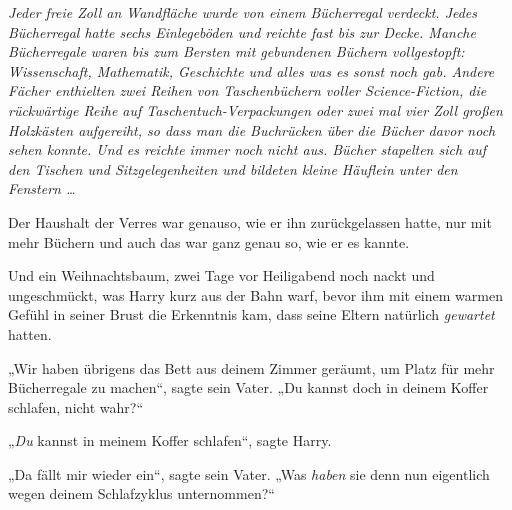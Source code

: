 \emph{Jeder freie Zoll an Wandfläche wurde von einem Bücherregal verdeckt. Jedes Bücherregal hatte sechs Einlegeböden und reichte fast bis zur Decke. Manche Bücherregale waren bis zum Bersten mit gebundenen Büchern vollgestopft: Wissenschaft, Mathematik, Geschichte und alles was es sonst noch gab. Andere Fächer enthielten zwei Reihen von Taschenbüchern voller Science-Fiction, die rückwärtige Reihe auf Taschentuch-Verpackungen oder zwei mal vier Zoll großen Holzkästen aufgereiht, so dass man die Buchrücken über die Bücher davor noch sehen konnte. Und es reichte immer noch nicht aus. Bücher stapelten sich auf den Tischen und Sitzgelegenheiten und bildeten kleine Häuflein unter den Fenstern …}

Der Haushalt der Verres war genauso, wie er ihn zurückgelassen hatte, nur mit mehr Büchern und auch das war ganz genau so, wie er es kannte.

Und ein Weihnachtsbaum, zwei Tage vor Heiligabend noch nackt und ungeschmückt, was Harry kurz aus der Bahn warf, bevor ihm mit einem warmen Gefühl in seiner Brust die Erkenntnis kam, dass seine Eltern natürlich \emph{gewartet} hatten.

„Wir haben übrigens das Bett aus deinem Zimmer geräumt, um Platz für mehr Bücherregale zu machen“, sagte sein Vater.
„Du kannst doch in deinem Koffer schlafen, nicht wahr?“

„\emph{Du} kannst in meinem Koffer schlafen“, sagte Harry.

„Da fällt mir wieder ein“, sagte sein Vater.
„Was \emph{haben} sie denn nun eigentlich wegen deinem Schlafzyklus unternommen?“

